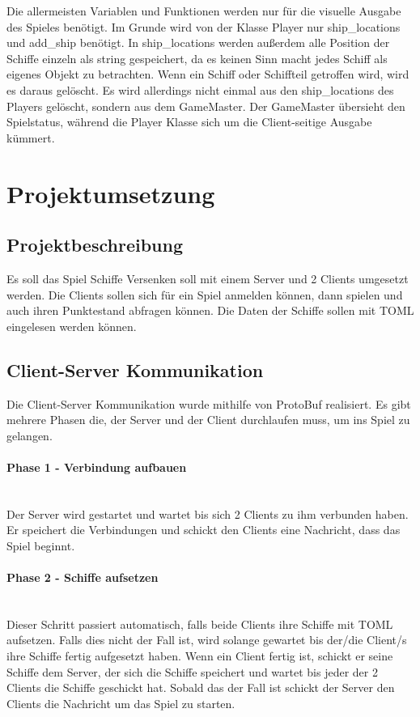 \documentclass{article}
\begin{document}
 \begin{flushleft}
\large
Die allermeisten Variablen und Funktionen werden nur für die visuelle Ausgabe des Spieles benötigt. Im Grunde wird von der Klasse Player nur ship\_locations und add\_ship benötigt. In ship\_locations werden außerdem alle Position der Schiffe einzeln als string gespeichert, da es keinen Sinn macht jedes Schiff als eigenes Objekt zu betrachten. Wenn ein Schiff oder Schiffteil getroffen wird, wird es daraus gelöscht. Es wird allerdings nicht einmal aus den ship\_locations des Players gelöscht, sondern aus dem GameMaster. Der GameMaster übersieht den Spielstatus, während die Player Klasse sich um die Client-seitige Ausgabe kümmert.



\large
\clearpage{}

\section{Projektumsetzung}


\subsection{Projektbeschreibung}

Es soll das Spiel Schiffe Versenken soll mit einem Server und 2 Clients umgesetzt werden. Die Clients sollen sich für ein Spiel anmelden können, dann spielen und auch ihren Punktestand abfragen können. Die Daten der Schiffe sollen mit TOML eingelesen werden können. 

\subsection{Client-Server Kommunikation}
Die Client-Server Kommunikation wurde mithilfe von ProtoBuf realisiert. Es gibt mehrere Phasen die, der Server und der Client durchlaufen muss, um ins Spiel zu gelangen. 
\paragraph{Phase 1 - Verbindung aufbauen}\mbox{}\\

Der Server wird gestartet und wartet bis sich 2 Clients zu ihm verbunden haben. Er speichert die Verbindungen und schickt den Clients eine Nachricht, dass das Spiel beginnt.

\paragraph{Phase 2 - Schiffe aufsetzen}\mbox{}\\
Dieser Schritt passiert automatisch, falls beide Clients ihre Schiffe mit TOML aufsetzen.
Falls dies nicht der Fall ist, wird solange gewartet bis der/die Client/s ihre Schiffe fertig aufgesetzt haben.
Wenn ein Client fertig ist, schickt er seine Schiffe dem Server, der sich die Schiffe speichert und wartet bis jeder der 2 Clients die Schiffe geschickt hat. Sobald das der Fall ist schickt der Server den Clients die Nachricht um das Spiel zu starten.


\end{flushleft}
\end{document}
